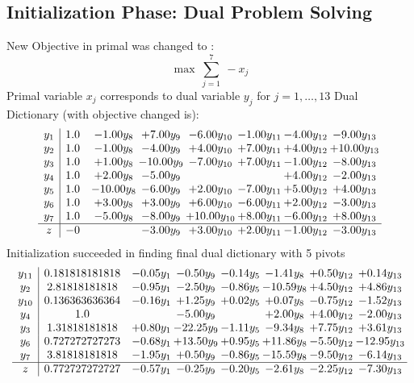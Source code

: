 \documentclass[8pt]{article}
\begin{document}
\subsection{Initialization Phase: Dual Problem Solving}
New Objective in primal was changed to : \[ \max\ \sum_{j=1}^{7}\ - x_j \] 
Primal variable $x_j$ corresponds to dual variable $y_j$ for $j = 1,\ldots,13$
Dual Dictionary (with objective changed is): 
\[\begin{array}{c| c c@{\hskip 2pt} c@{\hskip 2pt} c@{\hskip 2pt} c@{\hskip 2pt} c@{\hskip 2pt} c@{\hskip 2pt} }
 y_{1}   &  1.0 & -1.00 y_{8} & +  7.00 y_{9} & -6.00 y_{10} & -1.00 y_{11} & -4.00 y_{12} & -9.00 y_{13}\\
 y_{2}   &  1.0 & -1.00 y_{8} & -4.00 y_{9} & +  4.00 y_{10} & +  7.00 y_{11} & +  4.00 y_{12} & + 10.00 y_{13}\\
 y_{3}   &  1.0 & +  1.00 y_{8} & -10.00 y_{9} & -7.00 y_{10} & +  7.00 y_{11} & -1.00 y_{12} & -8.00 y_{13}\\
 y_{4}   &  1.0 & +  2.00 y_{8} & -5.00 y_{9} &    &   & +  4.00 y_{12} & -2.00 y_{13}\\
 y_{5}   &  1.0 & -10.00 y_{8} & -6.00 y_{9} & +  2.00 y_{10} & -7.00 y_{11} & +  5.00 y_{12} & +  4.00 y_{13}\\
 y_{6}   &  1.0 & +  3.00 y_{8} & +  3.00 y_{9} & +  6.00 y_{10} & -6.00 y_{11} & +  2.00 y_{12} & -3.00 y_{13}\\
 y_{7}   &  1.0 & -5.00 y_{8} & -8.00 y_{9} & + 10.00 y_{10} & +  8.00 y_{11} & -6.00 y_{12} & +  8.00 y_{13}\\
\hline
z    &  -0  &   & -3.00 y_{9} & +  3.00 y_{10} & +  2.00 y_{11} & -1.00 y_{12} & -3.00 y_{13}\\
\end{array}\]
Initialization succeeded in finding final dual dictionary with 5 pivots
\[\begin{array}{c| c c@{\hskip 2pt} c@{\hskip 2pt} c@{\hskip 2pt} c@{\hskip 2pt} c@{\hskip 2pt} c@{\hskip 2pt} }
 y_{11}   &  0.181818181818 & -0.05 y_{1} & -0.50 y_{9} & -0.14 y_{5} & -1.41 y_{8} & +  0.50 y_{12} & +  0.14 y_{13}\\
 y_{2}   &  2.81818181818 & -0.95 y_{1} & -2.50 y_{9} & -0.86 y_{5} & -10.59 y_{8} & +  4.50 y_{12} & +  4.86 y_{13}\\
 y_{10}   &  0.136363636364 & -0.16 y_{1} & +  1.25 y_{9} & +  0.02 y_{5} & +  0.07 y_{8} & -0.75 y_{12} & -1.52 y_{13}\\
 y_{4}   &  1.0  &   & -5.00 y_{9} &   & +  2.00 y_{8} & +  4.00 y_{12} & -2.00 y_{13}\\
 y_{3}   &  1.31818181818 & +  0.80 y_{1} & -22.25 y_{9} & -1.11 y_{5} & -9.34 y_{8} & +  7.75 y_{12} & +  3.61 y_{13}\\
 y_{6}   &  0.727272727273 & -0.68 y_{1} & + 13.50 y_{9} & +  0.95 y_{5} & + 11.86 y_{8} & -5.50 y_{12} & -12.95 y_{13}\\
 y_{7}   &  3.81818181818 & -1.95 y_{1} & +  0.50 y_{9} & -0.86 y_{5} & -15.59 y_{8} & -9.50 y_{12} & -6.14 y_{13}\\
\hline
z    &  0.772727272727 & -0.57 y_{1} & -0.25 y_{9} & -0.20 y_{5} & -2.61 y_{8} & -2.25 y_{12} & -7.30 y_{13}\\
\end{array}\]
\end{document}

